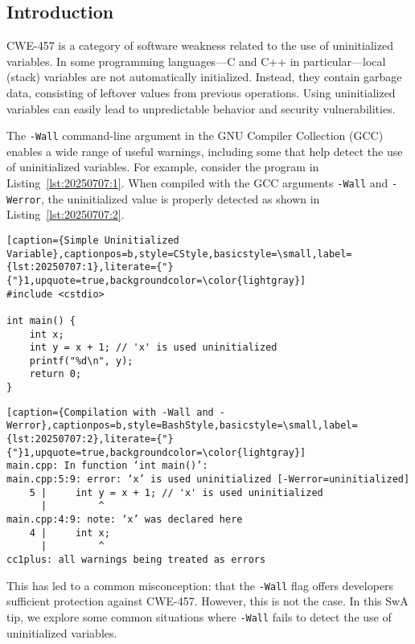 \subsection{Introduction}

CWE-457 is a category of software weakness related to the use of uninitialized variables.\autocite{20250707:cwe-457} In some programming languages---C and C++ in particular---local (stack) variables are not automatically initialized. Instead, they contain garbage data, consisting of leftover values from previous operations. Using uninitialized variables can easily lead to unpredictable behavior and security vulnerabilities.

\vspace{0.5cm}

The \texttt{-Wall} command-line argument in the GNU Compiler Collection (GCC) enables a wide range of useful warnings, including some that help detect the use of uninitialized variables. For example, consider the program in Listing~\ref{lst:20250707:1}. When compiled with the GCC arguments \texttt{-Wall} and \texttt{-Werror}, the uninitialized value is properly detected as shown in Listing~\ref{lst:20250707:2}.


\begin{lstlisting}[caption={Simple Uninitialized Variable},captionpos=b,style=CStyle,basicstyle=\small,label={lst:20250707:1},literate={"}{"}1,upquote=true,backgroundcolor=\color{lightgray}]
#include <cstdio>

int main() {
	int x;
	int y = x + 1; // 'x' is used uninitialized
	printf("%d\n", y);
	return 0;
}
\end{lstlisting}

\begin{lstlisting}[caption={Compilation with -Wall and -Werror},captionpos=b,style=BashStyle,basicstyle=\small,label={lst:20250707:2},literate={"}{"}1,upquote=true,backgroundcolor=\color{lightgray}]
main.cpp: In function ‘int main()’:
main.cpp:5:9: error: ‘x’ is used uninitialized [-Werror=uninitialized]
    5 |     int y = x + 1; // 'x' is used uninitialized
      |         ^
main.cpp:4:9: note: ‘x’ was declared here
    4 |     int x;
      |         ^
cc1plus: all warnings being treated as errors
\end{lstlisting}

This has led to a common misconception: that the \texttt{-Wall} flag offers developers sufficient protection against CWE-457. However, this is not the case. In this SwA tip, we explore some common situations where \texttt{-Wall} fails to detect the use of uninitialized variables.

